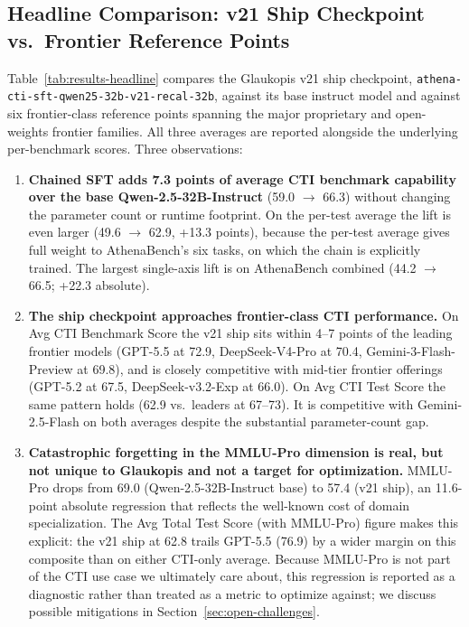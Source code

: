 \documentclass[unnumsec,webpdf,contemporary,large]{oup-authoring-template}
\theoremstyle{thmstyleone}
\theoremstyle{thmstyletwo}
\theoremstyle{thmstylethree}
\begin{document}
\subsection{Headline Comparison: v21 Ship Checkpoint vs.\ Frontier Reference Points}
\label{sec:results-headline}

Table~\ref{tab:results-headline} compares the Glaukopis v21 ship checkpoint, \texttt{athena-cti-sft-qwen25-32b-v21-recal-32b}, against its base instruct model and against six frontier-class reference points spanning the major proprietary and open-weights frontier families. All three averages are reported alongside the underlying per-benchmark scores. Three observations:

\begin{enumerate}
  \item \textbf{Chained SFT adds 7.3 points of average CTI benchmark capability over the base Qwen-2.5-32B-Instruct} (59.0 $\to$ 66.3) without changing the parameter count or runtime footprint. On the per-test average the lift is even larger (49.6 $\to$ 62.9, +13.3 points), because the per-test average gives full weight to AthenaBench's six tasks, on which the chain is explicitly trained. The largest single-axis lift is on AthenaBench combined (44.2 $\to$ 66.5; +22.3 absolute).
  \item \textbf{The ship checkpoint approaches frontier-class CTI performance.} On Avg CTI Benchmark Score the v21 ship sits within 4--7 points of the leading frontier models (GPT-5.5 at 72.9, DeepSeek-V4-Pro at 70.4, Gemini-3-Flash-Preview at 69.8), and is closely competitive with mid-tier frontier offerings (GPT-5.2 at 67.5, DeepSeek-v3.2-Exp at 66.0). On Avg CTI Test Score the same pattern holds (62.9 vs.\ leaders at 67--73). It is competitive with Gemini-2.5-Flash on both averages despite the substantial parameter-count gap.
  \item \textbf{Catastrophic forgetting in the MMLU-Pro dimension is real, but not unique to Glaukopis and not a target for optimization.} MMLU-Pro drops from 69.0 (Qwen-2.5-32B-Instruct base) to 57.4 (v21 ship), an 11.6-point absolute regression that reflects the well-known cost of domain specialization. The Avg Total Test Score (with MMLU-Pro) figure makes this explicit: the v21 ship at 62.8 trails GPT-5.5 (76.9) by a wider margin on this composite than on either CTI-only average. Because MMLU-Pro is not part of the CTI use case we ultimately care about, this regression is reported as a diagnostic rather than treated as a metric to optimize against; we discuss possible mitigations in Section~\ref{sec:open-challenges}.
\end{enumerate}
\end{document}
